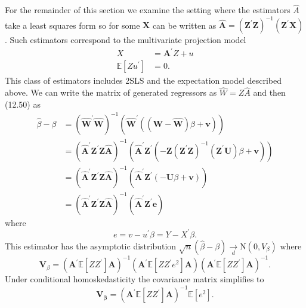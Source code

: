 \documentclass[10pt]{article}
\begin{document}
For the remainder of this section we examine the setting where the estimators $\widehat{A}$ take a least squares form so for some $\boldsymbol{X}$ can be written as $\widehat{\boldsymbol{A}}=\left(\boldsymbol{Z}^{\prime} \boldsymbol{Z}\right)^{-1}\left(\boldsymbol{Z}^{\prime} \boldsymbol{X}\right)$. Such estimators correspond to the multivariate projection model
$$
\begin{aligned}
X &=\boldsymbol{A}^{\prime} Z+u \\
\mathbb{E}\left[Z u^{\prime}\right] &=0 .
\end{aligned}
$$
This class of estimators includes 2SLS and the expectation model described above. We can write the matrix of generated regressors as $\widehat{W}=Z \widehat{A}$ and then (12.50) as
$$
\begin{aligned}
\widehat{\beta}-\beta &=\left(\widehat{\boldsymbol{W}}^{\prime} \widehat{\boldsymbol{W}}\right)^{-1}\left(\widehat{\boldsymbol{W}}^{\prime}((\boldsymbol{W}-\widehat{\boldsymbol{W}}) \beta+\boldsymbol{v})\right) \\
&=\left(\widehat{\boldsymbol{A}}^{\prime} \boldsymbol{Z}^{\prime} \boldsymbol{Z} \widehat{\boldsymbol{A}}\right)^{-1}\left(\widehat{\boldsymbol{A}}^{\prime} \boldsymbol{Z}^{\prime}\left(-\boldsymbol{Z}\left(\boldsymbol{Z}^{\prime} \boldsymbol{Z}\right)^{-1}\left(\boldsymbol{Z}^{\prime} \boldsymbol{U}\right) \beta+\boldsymbol{v}\right)\right) \\
&=\left(\widehat{\boldsymbol{A}}^{\prime} \boldsymbol{Z}^{\prime} \boldsymbol{Z} \widehat{\boldsymbol{A}}\right)^{-1}\left(\widehat{\boldsymbol{A}}^{\prime} \boldsymbol{Z}^{\prime}(-\boldsymbol{U} \beta+\boldsymbol{v})\right) \\
&=\left(\widehat{\boldsymbol{A}}^{\prime} \boldsymbol{Z}^{\prime} \boldsymbol{Z} \widehat{\boldsymbol{A}}\right)^{-1}\left(\widehat{\boldsymbol{A}}^{\prime} \boldsymbol{Z}^{\prime} \boldsymbol{e}\right)
\end{aligned}
$$
where
$$
e=v-u^{\prime} \beta=Y-X^{\prime} \beta .
$$
This estimator has the asymptotic distribution $\sqrt{n}(\widehat{\beta}-\beta) \underset{d}{\longrightarrow} \mathrm{N}\left(0, V_{\beta}\right)$ where
$$
\boldsymbol{V}_{\beta}=\left(\boldsymbol{A}^{\prime} \mathbb{E}\left[Z Z^{\prime}\right] \boldsymbol{A}\right)^{-1}\left(\boldsymbol{A}^{\prime} \mathbb{E}\left[Z Z^{\prime} e^{2}\right] \boldsymbol{A}\right)\left(\boldsymbol{A}^{\prime} \mathbb{E}\left[Z Z^{\prime}\right] \boldsymbol{A}\right)^{-1} .
$$
Under conditional homoskedasticity the covariance matrix simplifies to
$$
\boldsymbol{V}_{\boldsymbol{\beta}}=\left(\boldsymbol{A}^{\prime} \mathbb{E}\left[Z Z^{\prime}\right] \boldsymbol{A}\right)^{-1} \mathbb{E}\left[e^{2}\right] .
$$
\end{document}
